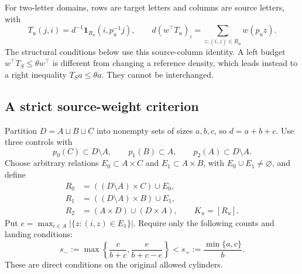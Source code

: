 \documentclass[11pt,reqno]{amsart}
\numberwithin{equation}{section}
\theoremstyle{definition}
\theoremstyle{definition}
\newcommand{\one}{\mathbf 1}
\begin{document}
For two-letter domains, rows are target letters and columns are
source letters, with
\begin{equation}\label{eq:cyl-two}
 T_u(j,i)=d^{-1}\one_{R_u}(i,p_u^{-1}j),\qquad
 d(w^\top T_u)_i=\sum_{z:(i,z)\in R_u}w(p_uz).
\end{equation}
The structural conditions below use this source-column identity.
A left budget $w^\top T_S\le\theta w^\top$ is different from
changing a reference density, which leads instead to a right
inequality $T_Sa\le\theta a$. They cannot be interchanged.

\subsection{A strict source-weight criterion}
Partition $D=A\sqcup B\sqcup C$ into nonempty sets of sizes
$a,b,c$, so $d=a+b+c$. Use three controls with
\begin{equation}\label{eq:weight-land}
 p_0(C)\subset D\setminus A,\qquad p_1(B)\subset A,
 \qquad p_2(A)\subset D\setminus A.
\end{equation}
Choose arbitrary relations $E_0\subset A\times C$ and
$E_1\subset A\times B$, with $E_0\cup E_1\ne\varnothing$,
and define
\begin{align}
 R_0&=((D\setminus A)\times C)\cup E_0,\nonumber\\
 R_1&=((D\setminus A)\times B)\cup E_1,\label{eq:weight-domains}\\
 R_2&=(A\times D)\cup(D\times A),\qquad K_u=[R_u].\nonumber
\end{align}
Put $e=\max_{i\in A}|\{z:(i,z)\in E_1\}|$. Require only
the following counts and landing conditions:
\begin{equation}\label{eq:weight-count}
 s_-:=\max\left\{\frac c{b+c},\frac e{b+c-e}\right\}
 <s_+:=\frac{\min\{a,c\}}b.
\end{equation}
These are direct conditions on the original allowed cylinders.
\end{document}
